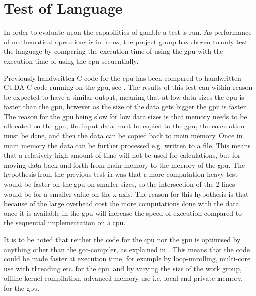 \chapter{Test of Language} %
\label{cha:test_of_language}
In order to evaluate upon the capabilities of \gls{gamble} a test is run. 
As performance of mathematical operations is in focus, the project group has chosen to only test the language by comparing the execution time of using the \gls{gpu} with the execution time of using the \gls{cpu} sequentially.

Previously handwritten C code for the \gls{cpu} has been compared to handwritten CUDA C code running on the \gls{gpu}, see .
The results of this test can within reason be expected to have a similar output, meaning that at low data sizes the \gls{cpu} is faster than the \gls{gpu}, however as the size of the data gets bigger the \gls{gpu} is faster.
The reason for the \gls{gpu} being slow for low data sizes is that memory needs to be allocated on the \gls{gpu}, the input data must be copied to the \gls{gpu}, the calculation must be done, and then the data can be copied back to main memory. 
Once in main memory the data can be further processed e.g. written to a file. 
This means that a relatively high amount of time will not be used for calculations, but for moving data back and forth from main memory to the memory of the \gls{gpu}.
The hypothesis from the previous test in  was that a more computation heavy test would be faster on the \acrshort{gpu} on smaller sizes, so the intersection of the 2 lines would be for a smaller value on the x-axis. 
The reason for this hypothesis is that because of the large overhead cost the more computations done with the data once it is available in the \acrshort{gpu} will increase the speed of execution compared to the sequential implementation on a \acrshort{cpu}.

It is to be noted that neither the code for the \gls{cpu} nor the \gls{gpu} is optimised by anything other than the gcc-compiler, as explained in . 
This means that the code could be made faster at execution time, for example by loop-unrolling, multi-core use with threading etc. for the \gls{cpu}, and by varying the size of the work group, offline kernel compilation, advanced memory use i.e. local and private memory, for the \gls{gpu}.  

